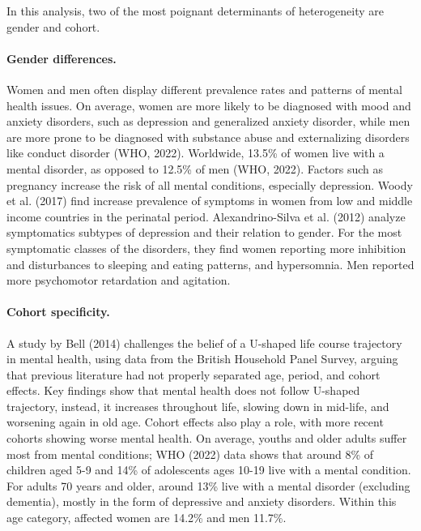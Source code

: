             In this analysis, two of the most poignant determinants of heterogeneity are gender and cohort. 


    \paragraph{Gender differences.}
        Women and men often display different prevalence rates and patterns of mental health issues.
        On average, women are more likely to be diagnosed with mood and anxiety disorders, such as depression and generalized anxiety disorder, while men are more prone to be diagnosed with substance abuse and externalizing disorders like conduct disorder (WHO, 2022). Worldwide, 13.5\% of women live with a mental disorder, as opposed to 12.5\% of men (WHO, 2022). 
        Factors such as pregnancy increase the risk of all mental conditions, especially depression. Woody et al. (2017) find increase prevalence of symptoms in women from low and middle income countries in the perinatal period. 
        Alexandrino-Silva et al. (2012) analyze symptomatics subtypes of depression and their relation to gender. For the most symptomatic classes of the disorders, they find women reporting more inhibition and disturbances to sleeping and eating patterns, and hypersomnia. Men reported more psychomotor retardation and agitation. 


    \paragraph{Cohort specificity.}
    A study by Bell (2014) challenges the belief of a U-shaped life course trajectory in mental health, using data from the British Household Panel Survey, arguing that previous literature had not properly separated age, period, and cohort effects. Key findings show that mental health does not follow  U-shaped trajectory, instead, it increases throughout life, slowing down in mid-life, and worsening again in old age. Cohort effects also play a role, with more recent cohorts showing worse mental health. 
    On average, youths and older adults suffer most from mental conditions; WHO (2022) data shows that around 8\% of children aged 5-9 and 14\% of adolescents ages 10-19 live with a mental condition. For adults 70 years and older, around 13\% live with a mental disorder (excluding dementia), mostly in the form of depressive and anxiety disorders. Within this age category, affected women are 14.2\% and men 11.7\%.

